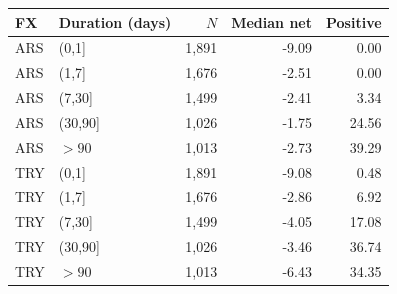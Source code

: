 \begin{tabular}{llrrr}
\toprule
FX & Duration (days) & $N$ & Median net & Positive \\
\midrule
ARS & (0,1] & 1,891 & -9.09 & 0.00 \\
ARS & (1,7] & 1,676 & -2.51 & 0.00 \\
ARS & (7,30] & 1,499 & -2.41 & 3.34 \\
ARS & (30,90] & 1,026 & -1.75 & 24.56 \\
ARS & $>90$ & 1,013 & -2.73 & 39.29 \\
TRY & (0,1] & 1,891 & -9.08 & 0.48 \\
TRY & (1,7] & 1,676 & -2.86 & 6.92 \\
TRY & (7,30] & 1,499 & -4.05 & 17.08 \\
TRY & (30,90] & 1,026 & -3.46 & 36.74 \\
TRY & $>90$ & 1,013 & -6.43 & 34.35 \\
\bottomrule
\end{tabular}
